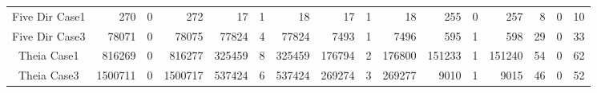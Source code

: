 \begin{table*}[t]
{\begin{tabular}{c|rrr|rrr|rrr|rrr|rrr}
Five Dir Case1       & 270                                         & 0                                           & 272                                       & 17                                          & 1                                           & 18                                        & 17                                          & 1                                           & 18                                        & 255                                         & 0                                           & 257                                       & 8                                           & 0                                           & 10                                       \\
Five Dir Case3       & 78071                                       & 0                                           & 78075                                     & 77824                                       & 4                                           & 77824                                     & 7493                                        & 1                                           & 7496                                      & 595                                         & 1                                           & 598                                       & 29                                          & 0                                           & 33                                       \\
Theia Case1          & 816269                                      & 0                                           & 816277                                    & 325459                                      & 8                                           & 325459                                    & 176794                                      & 2                                           & 176800                                    & 151233                                      & 1                                           & 151240                                    & 54                                          & 0                                           & 62                                       \\
Theia Case3          & 1500711                                     & 0                                           & 1500717                                   & 537424                                      & 6                                           & 537424                                    & 269274                                      & 3                                           & 269277                                    & 9010                                        & 1                                           & 9015                                      & 46                                          & 0                                           & 52                                       \\

\end{tabular}}
\end{table*}
